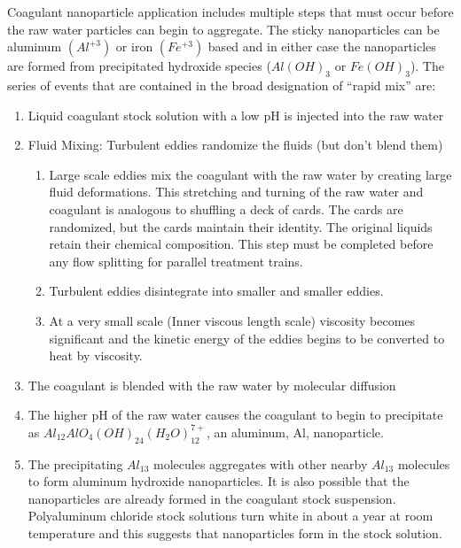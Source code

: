 \documentclass[letterpaper,10pt,english]{sphinxmanual}
\begin{document}
Coagulant nanoparticle application includes multiple steps that must occur before the raw water particles can begin to aggregate. The sticky nanoparticles can be aluminum \((Al^{+3})\) or iron \((Fe^{+3})\) based and in either case the nanoparticles are formed from precipitated hydroxide species (\(Al(OH)_3\) or \(Fe(OH)_3\)). The series of events that are contained in the broad designation of “rapid mix” are:
\begin{enumerate}
\item {} 
Liquid coagulant stock solution with a low pH is injected into the raw water

\item {} 
Fluid Mixing: Turbulent eddies randomize the fluids (but don’t blend them)
\begin{enumerate}
\item {} 
Large scale eddies mix the coagulant with the raw water by creating large fluid deformations. This stretching and turning of the raw water and coagulant is analogous to shuffling a deck of cards. The cards are randomized, but the cards maintain their identity. The original liquids retain their chemical composition. This step must be completed before any flow splitting for parallel treatment trains.

\item {} 
Turbulent eddies disintegrate into smaller and smaller eddies.

\item {} 
At a very small scale (Inner viscous length scale) viscosity becomes significant and the kinetic energy of the eddies begins to be converted to heat by viscosity.

\end{enumerate}

\item {} 
The coagulant is blended with the raw water by molecular diffusion

\item {} 
The higher pH of the raw water causes the coagulant to begin to precipitate as \(Al_{12}AlO_4(OH)_{24}(H_2O)_{12}^{7+}\), an aluminum, Al, nanoparticle.

\item {} 
The precipitating \(Al_{13}\) molecules aggregates with other nearby \(Al_{13}\) molecules to form aluminum hydroxide nanoparticles. It is also possible that the nanoparticles are already formed in the coagulant stock suspension. Polyaluminum chloride stock solutions turn white in about a year at room temperature and this suggests that nanoparticles form in the stock solution.


\end{enumerate}
\end{document}
